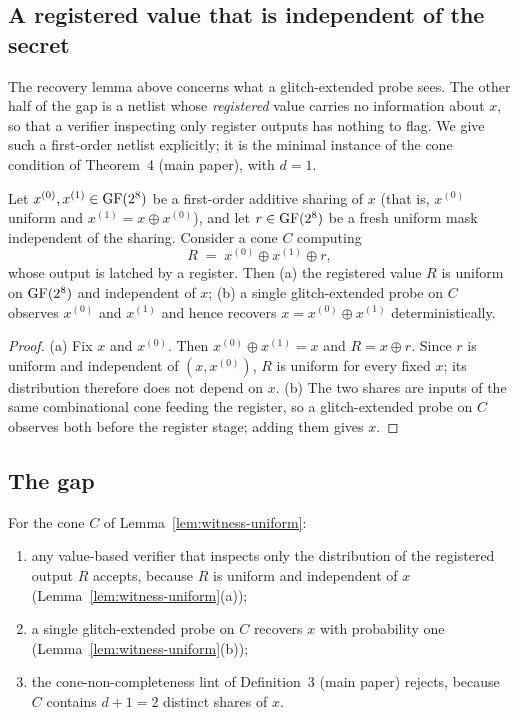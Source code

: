 \documentclass[journal,onecolumn]{IEEEtran}
\begin{document}
\subsection{A registered value that is independent of the secret}

The recovery lemma above concerns what a glitch-extended probe sees.
The other half of the gap is a netlist whose \emph{registered} value
carries no information about $x$, so that a verifier inspecting only
register outputs has nothing to flag. We give such a first-order
netlist explicitly; it is the minimal instance of the cone condition
of Theorem~4 (main paper), with $d=1$.

\begin{lemma}
\label{lem:witness-uniform}
Let $x^{(0)},x^{(1)}\in\mathrm{GF}(2^{8})$ be a first-order additive sharing of
$x$ (that is, $x^{(0)}$ uniform and $x^{(1)}=x\oplus x^{(0)}$), and let
$r\in\mathrm{GF}(2^{8})$ be a fresh uniform mask independent of the sharing.
Consider a cone $C$ computing
\begin{equation}
R \;=\; x^{(0)}\oplus x^{(1)}\oplus r ,
\label{eq:witness-R}
\end{equation}
whose output is latched by a register. Then (a) the registered value
$R$ is uniform on $\mathrm{GF}(2^{8})$ and independent of $x$; (b) a single
glitch-extended probe on $C$ observes $x^{(0)}$ and $x^{(1)}$ and hence
recovers $x=x^{(0)}\oplus x^{(1)}$ deterministically.
\end{lemma}

\begin{proof}
(a) Fix $x$ and $x^{(0)}$. Then $x^{(0)}\oplus x^{(1)}=x$ and
$R=x\oplus r$. Since $r$ is uniform and independent of
$(x,x^{(0)})$, $R$ is uniform for every fixed $x$; its distribution
therefore does not depend on $x$. (b) The two shares are inputs of the
same combinational cone feeding the register, so a glitch-extended
probe on $C$ observes both before the register stage; adding them gives
$x$.
\end{proof}

\subsection{The gap}

\begin{theorem}
\label{thm:witness-gap}
For the cone $C$ of Lemma~\ref{lem:witness-uniform}:
\begin{enumerate}
\item any value-based verifier that inspects only the distribution of
the registered output $R$ accepts, because $R$ is uniform and
independent of $x$ (Lemma~\ref{lem:witness-uniform}(a));
\item a single glitch-extended probe on $C$ recovers $x$ with
probability one (Lemma~\ref{lem:witness-uniform}(b));
\item the cone-non-completeness lint of Definition~3 (main paper)
rejects, because $C$ contains $d{+}1=2$ distinct shares of $x$.
\end{enumerate}
\end{theorem}
\end{document}
